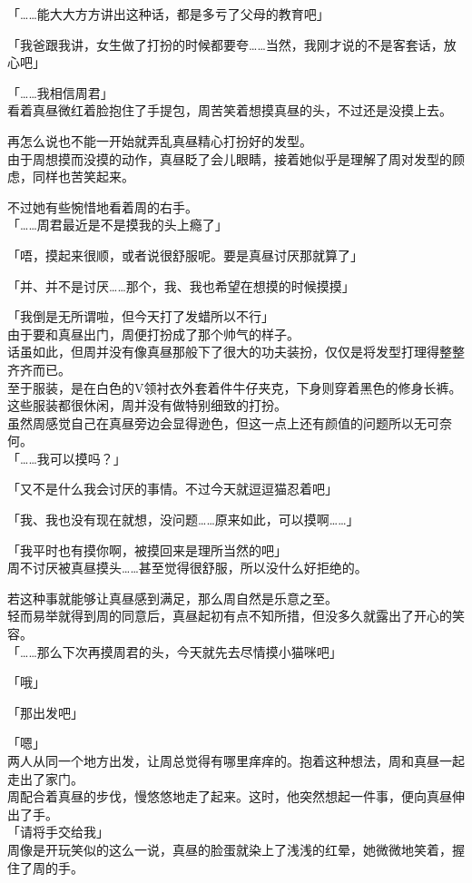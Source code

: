 「……能大大方方讲出这种话，都是多亏了父母的教育吧」

「我爸跟我讲，女生做了打扮的时候都要夸……当然，我刚才说的不是客套话，放心吧」

「……我相信周君」\\

看着真昼微红着脸抱住了手提包，周苦笑着想摸真昼的头，不过还是没摸上去。

再怎么说也不能一开始就弄乱真昼精心打扮好的发型。\\

由于周想摸而没摸的动作，真昼眨了会儿眼睛，接着她似乎是理解了周对发型的顾虑，同样也苦笑起来。

不过她有些惋惜地看着周的右手。\\

「……周君最近是不是摸我的头上瘾了」

「唔，摸起来很顺，或者说很舒服呢。要是真昼讨厌那就算了」

「并、并不是讨厌……那个，我、我也希望在想摸的时候摸摸」

「我倒是无所谓啦，但今天打了发蜡所以不行」\\

由于要和真昼出门，周便打扮成了那个帅气的样子。\\

话虽如此，但周并没有像真昼那般下了很大的功夫装扮，仅仅是将发型打理得整整齐齐而已。\\

至于服装，是在白色的V领衬衣外套着件牛仔夹克，下身则穿着黑色的修身长裤。这些服装都很休闲，周并没有做特别细致的打扮。\\

虽然周感觉自己在真昼旁边会显得逊色，但这一点上还有颜值的问题所以无可奈何。\\

「……我可以摸吗？」

「又不是什么我会讨厌的事情。不过今天就逗逗猫忍着吧」

「我、我也没有现在就想，没问题……原来如此，可以摸啊……」

「我平时也有摸你啊，被摸回来是理所当然的吧」\\

周不讨厌被真昼摸头……甚至觉得很舒服，所以没什么好拒绝的。

若这种事就能够让真昼感到满足，那么周自然是乐意之至。\\

轻而易举就得到周的同意后，真昼起初有点不知所措，但没多久就露出了开心的笑容。\\

「……那么下次再摸周君的头，今天就先去尽情摸小猫咪吧」

「哦」

「那出发吧」

「嗯」\\

两人从同一个地方出发，让周总觉得有哪里痒痒的。抱着这种想法，周和真昼一起走出了家门。\\

周配合着真昼的步伐，慢悠悠地走了起来。这时，他突然想起一件事，便向真昼伸出了手。\\

「请将手交给我」\\

周像是开玩笑似的这么一说，真昼的脸蛋就染上了浅浅的红晕，她微微地笑着，握住了周的手。
